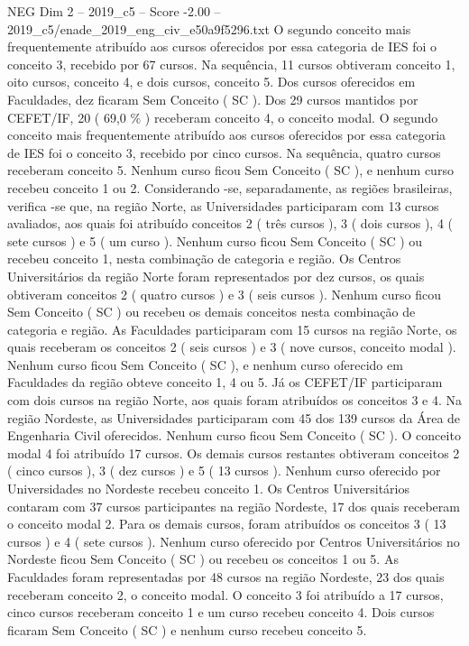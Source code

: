 \begin{textsample}{NEG Dim 2 – 2019\_c5 – Score -2.00 – 2019\_c5/enade\_2019\_eng\_civ\_e50a9f5296.txt}
O segundo conceito mais frequentemente atribuído aos cursos oferecidos por essa categoria de IES foi o conceito 3, recebido por 67 cursos.
Na sequência, 11 cursos obtiveram conceito 1, oito cursos, conceito 4, e dois cursos, conceito 5.
Dos cursos oferecidos em Faculdades, dez ficaram Sem Conceito ( SC ).
Dos 29 cursos mantidos por CEFET/IF, 20 ( 69,0 \% ) receberam conceito 4, o conceito modal.
O segundo conceito mais frequentemente atribuído aos cursos oferecidos por essa categoria de IES foi o conceito 3, recebido por cinco cursos.
Na sequência, quatro cursos receberam conceito 5.
Nenhum curso ficou Sem Conceito ( SC ), e nenhum curso recebeu conceito 1 ou 2.
Considerando -se, separadamente, as regiões brasileiras, verifica -se que, na região Norte, as Universidades participaram com 13 cursos avaliados, aos quais foi atribuído conceitos 2 ( três cursos ), 3 ( dois cursos ), 4 ( sete cursos ) e 5 ( um curso ).
Nenhum curso ficou Sem Conceito ( SC ) ou recebeu conceito 1, nesta combinação de categoria e região.
Os Centros Universitários da região Norte foram representados por dez cursos, os quais obtiveram conceitos 2 ( quatro cursos ) e 3 ( seis cursos ).
Nenhum curso ficou Sem Conceito ( SC ) ou recebeu os demais conceitos nesta combinação de categoria e região.
As Faculdades participaram com 15 cursos na região Norte, os quais receberam os conceitos 2 ( seis cursos ) e 3 ( nove cursos, conceito modal ).
Nenhum curso ficou Sem Conceito ( SC ), e nenhum curso oferecido em Faculdades da região obteve conceito 1, 4 ou 5.
Já os CEFET/IF participaram com dois cursos na região Norte, aos quais foram atribuídos os conceitos 3 e 4.
Na região Nordeste, as Universidades participaram com 45 dos 139 cursos da Área de Engenharia Civil oferecidos.
Nenhum curso ficou Sem Conceito ( SC ).
O conceito modal 4 foi atribuído 17 cursos.
Os demais cursos restantes obtiveram conceitos 2 ( cinco cursos ), 3 ( dez cursos ) e 5 ( 13 cursos ).
Nenhum curso oferecido por Universidades no Nordeste recebeu conceito 1.
Os Centros Universitários contaram com 37 cursos participantes na região Nordeste, 17 dos quais receberam o conceito modal 2.
Para os demais cursos, foram atribuídos os conceitos 3 ( 13 cursos ) e 4 ( sete cursos ).
Nenhum curso oferecido por Centros Universitários no Nordeste ficou Sem Conceito ( SC ) ou recebeu os conceitos 1 ou 5.
As Faculdades foram representadas por 48 cursos na região Nordeste, 23 dos quais receberam conceito 2, o conceito modal.
O conceito 3 foi atribuído a 17 cursos, cinco cursos receberam conceito 1 e um curso recebeu conceito 4.
Dois cursos ficaram Sem Conceito ( SC ) e nenhum curso recebeu conceito 5.

\end{textsample}
